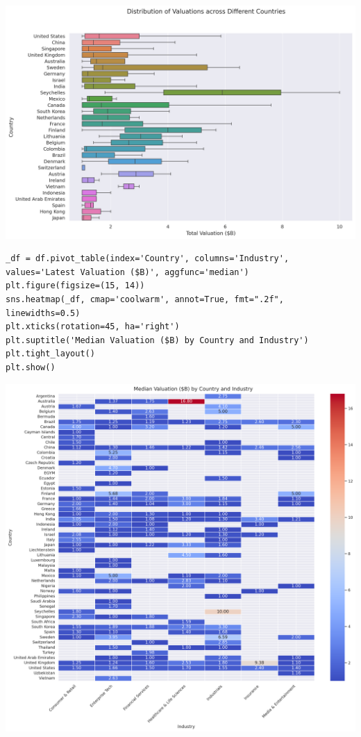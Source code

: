 \documentclass[a4paper,12pt]{article}
\begin{document}
\begin{center}
\includegraphics[width=.9\linewidth]{./.ob-jupyter/39fd31b873ab703c2f80e4c7c699be49ab648904.png}
\label{}
\end{center}

\begin{verbatim}
_df = df.pivot_table(index='Country', columns='Industry', values='Latest Valuation ($B)', aggfunc='median')
plt.figure(figsize=(15, 14))
sns.heatmap(_df, cmap='coolwarm', annot=True, fmt=".2f", linewidths=0.5)
plt.xticks(rotation=45, ha='right')
plt.suptitle('Median Valuation ($B) by Country and Industry')
plt.tight_layout()
plt.show()
\end{verbatim}

\begin{center}
\includegraphics[width=.9\linewidth]{./.ob-jupyter/8191e29d90b7253a853630fc7935bf3868045f13.png}
\label{}
\end{center}
\end{document}
